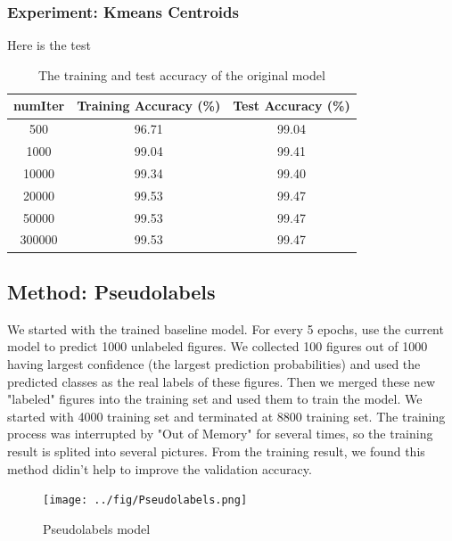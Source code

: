 \documentclass[final]{siamltexmm}
\begin{document}
\subsubsection{Experiment: K­means Centroids}
Here is the test
\begin{table}[H]
\begin{center}
    \begin{tabular}{| c | c | c |}
    \hline
    numIter & Training Accuracy (\%) & Test Accuracy (\%) \\ \hline
    500 & 96.71 & 99.04 \\ \hline
    1000 & 99.04 & 99.41 \\ \hline
    10000 & 99.34 & 99.40 \\ \hline
    20000 & 99.53 & 99.47 \\ \hline
    50000 & 99.53 & 99.47 \\ \hline
    300000 & 99.53 & 99.47 \\ \hline
    \end{tabular}
\end{center}
\caption{The training and test accuracy of the original model}
\end{table}

\subsection{Method: Pseudo­labels}
We started with the trained baseline model. For every 5 epochs, use the current model to predict 1000 unlabeled figures. We collected 100 figures out of 1000 having largest confidence (the largest prediction probabilities) and used the predicted classes as the real labels of these figures. Then we merged these new "labeled" figures into the training set and used them to train the model. We started with 4000 training set and terminated at 8800 training set. The training process was interrupted by "Out of Memory" for several times, so the training result is splited into several pictures. From the training result, we found this method didin't help to improve the validation accuracy. 
\begin{figure}[H]
\centering
\texttt{[image: ../fig/Pseudo­labels.png]}
  \caption{Pseudo­labels model}
\end{figure}
\end{document}

